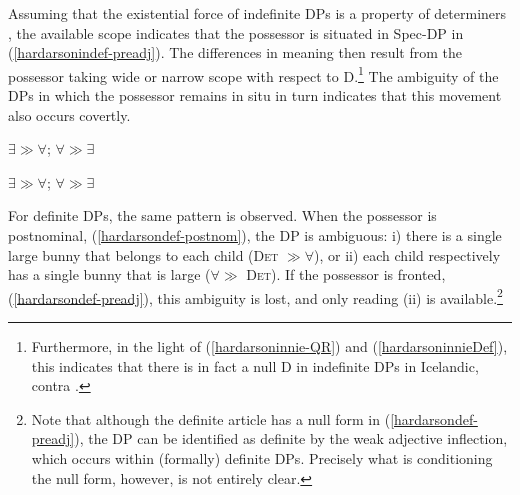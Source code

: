 \documentclass[output=paper,colorlinks,citecolor=brown,
]{langscibook}
\begin{document}
\noindent Assuming that the existential force of indefinite DPs is a property of determiners  \citep[cf.][]{chierchia1992}, the available scope indicates that the possessor is situated in Spec-DP in (\ref{hardarsonindef-preadj}). The differences in meaning then result from the possessor taking wide or narrow scope with respect to D.\footnote{Furthermore, in the light of (\ref{hardarsoninnie-QR}) and (\ref{hardarsoninnieDef}), this indicates that there is in fact a null D in indefinite DPs in Icelandic, contra \cite{Hardarson:2016wd}.} The ambiguity of the DPs in which the possessor remains in situ in turn indicates that this movement also occurs covertly.

\begin{exe}
    \begin{multicols}{2}
    \ex $\exists \gg \forall$; $\forall \gg \exists$\\
         \columnbreak
    \ex *$\exists \gg \forall$; $\forall \gg \exists$\\
    \end{multicols}
\end{exe}

For definite DPs, the same pattern is observed. When the possessor is postnominal, (\ref{hardarsondef-postnom}), the DP is ambiguous: i) there is a single large bunny that belongs to each child (\textsc{Det} $\gg \forall$), or ii) each child respectively has a single bunny that is large ($\forall \gg$ \textsc{Det}). If the possessor is fronted, (\ref{hardarsondef-preadj}), this ambiguity is lost, and only reading (ii) is available.\footnote{Note that although the definite article has a null form in (\ref{hardarsondef-preadj}), the DP can be identified as definite by the weak adjective inflection, which occurs within (formally) definite DPs. Precisely what is conditioning the null form, however, is not entirely clear.}
\end{document}
